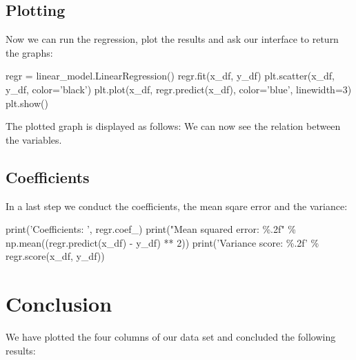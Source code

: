 \documentclass[12pt,a4paper,bibliography=totocnumbered,listof=totocnumbered]{scrartcl}
\begin{document}
\subsection{Plotting}

Now we can run the regression, plot the results and ask our interface to return the graphs:
\begin{1stlisting}
regr = linear_model.LinearRegression()
regr.fit(x_df, y_df)
plt.scatter(x_df, y_df, color='black')
plt.plot(x_df, regr.predict(x_df), color='blue', linewidth=3)
plt.show()
\end{1stlisting}

The plotted graph is displayed as follows: 
We can now see the relation between the variables. 

\subsection{Coefficients}
In a last step we conduct the coefficients, the mean sqare error and the variance:
\begin{1stlisting}
print('Coefficients: \n', regr.coef_)
print("Mean squared error: \%.2f" \% np.mean((regr.predict(x_df) - y_df) ** 2))
print('Variance score: \%.2f' \% regr.score(x_df, y_df))
\end{1stlisting}

\newpage
\section{Conclusion}

We have plotted the four columns of our data set and concluded the following results: 

\end{document}
